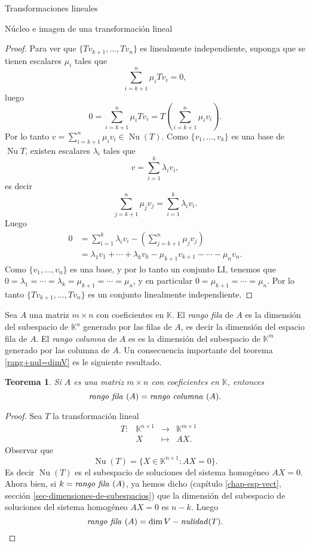\documentclass[a4paper,12pt,twoside,spanish,reqno]{amsbook}
\newtheorem{teorema}{Teorema}[section]
\theoremstyle{definition}
\theoremstyle{remark}
\newcommand{\nuc}{\operatorname{Nu}}
\newcommand{\K}{\mathbb K}
\begin{document}
\begin{chapter}{Transformaciones lineales}
\begin{section}{Núcleo e imagen de una transformación lineal}
\begin{proof}
		 	Para ver que  $\{Tv_{k+1},\ldots,Tv_n \}$ es linealmente independiente, suponga que se tienen escalares $\mu_i$ tales que
		 	$$
		 	\sum_{i=k+1}^n \mu_i Tv_i = 0,
		 	$$
		 	luego
		 	$$
		 	0 = \sum_{i=k+1}^n \mu_i Tv_i =   T(\sum_{i=k+1}^n\mu_iv_i).  
		 	$$
		 	Por lo tanto $v =\sum_{i=k+1}^n \mu_iv_i\in \nuc(T)$. Como  $\{v_1,\ldots,v_k \}$ es una base de $\nuc T$,  existen escalares $\lambda_i$ tales que
		 	$$
		 	v =  \sum_{i=1}^k \lambda_i v_i,
		 	$$
		 	es decir
		 	$$
		 	\sum_{j=k+1}^n \mu_jv_j =  \sum_{i=1}^k \lambda_i v_i.
		 	$$
		 	Luego
		 	\begin{align*}
		 			0 &= \sum_{i=1}^k \lambda_i v_i - (\sum_{j=k+1}^n \mu_jv_j) \\
		 			&= \lambda_1 v_1 + \cdots +\lambda_k v_k - \mu_{k+1}v_{k+1} -\cdots-\mu_nv_n.
		 	\end{align*}
		 	Como $\{v_1,\ldots,v_n \}$ es una base, y por lo tanto un conjunto LI,  tenemos que  $0=\lambda_1=\cdots=\lambda_k=\mu_{k+1}=\cdots=\mu_n$, y  en particular $0=\mu_{k+1}=\cdots=\mu_n$. Por lo tanto $\{Tv_{k+1},\ldots,Tv_n \}$ es un conjunto linealmente independiente.		  
		\end{proof}
		
	
		
		Sea $A$ una matriz $m \times n$ con coeficientes  en $\K$. El  \textit{rango fila} de $A$ es la dimensión del subespacio de $\K^n$ generado por las filas de $A$, es decir la dimensión del espacio fila de $A$. El \textit{rango columna} de $A$  es es la dimensión del subespacio de $\K^m$ generado por las columna de $A$. Un  consecuencia importante del teorema \ref{rang+nul=dimV} es le siguiente resultado. 
		
		\begin{teorema}
			Si $A$ es una matriz $m \times n$ con coeficientes  en $\K$, entonces
			$$
			\text{\textit{rango fila }} (A) = \text{\textit{rango  columna }} (A).
			$$
		\end{teorema}
		\begin{proof}
			Sea $T$ la transformación lineal
			\begin{equation*}
				\begin{array}{lllll}
				&T: &\K^{n \times 1} &\to &\K^{m \times 1} \\
				&&X &\mapsto &AX.
				\end{array}
			\end{equation*}
			Observar que
			$$
			\nuc(T) = \{X \in \K^{n \times 1}: AX=0 \}.
			$$
			Es decir $\nuc(T)$  es el subespacio de soluciones del sistema homogéneo $AX=0$. Ahora bien, si $k = \text{\textit{rango fila }} (A)$, ya hemos dicho (capítulo \ref{chap-esp-vect}, sección \ref{sec-dimensiones-de-subespacios}) que la dimensión del subespacio de soluciones del sistema homogéneo $AX=0$ es $n-k$. Luego
			\begin{equation}\label{rangofila=n-nulT}
				\text{\textit{rango fila }} (A) = \dim V - \text{\textit{nulidad}}(T). 
			\end{equation}
			

\end{proof}
\end{section}
\end{chapter}
\end{document}
